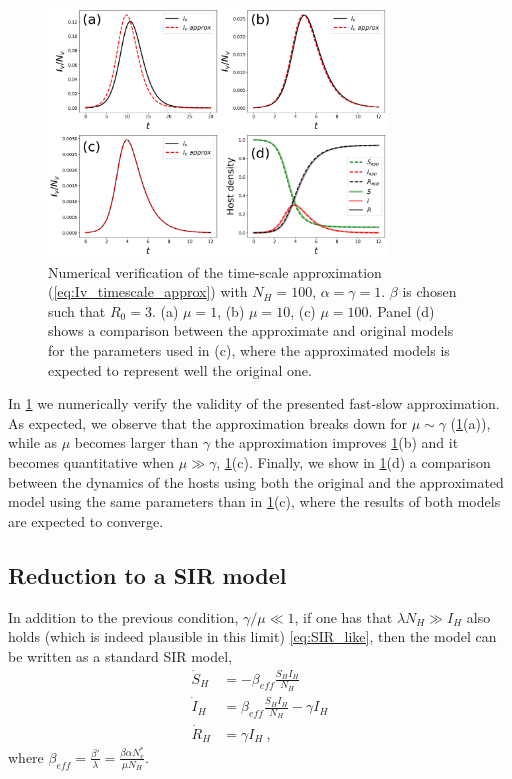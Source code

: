 \begin{figure}[H]
    \centering
    \includegraphics[width=0.8\textwidth]{Figures/Timescale_approx.pdf}
    \caption{Numerical verification of the time-scale approximation
        (\cref{eq:Iv_timescale_approx}) with $N_H=100$, $\alpha=\gamma=1$.
        $\beta$ is
        chosen such that $R_0=3$. (a) $\mu=1$, (b) $\mu=10$, (c) $\mu=100$.
        Panel (d)
        shows a comparison between the approximate and original models for the
        parameters used in (c), where the approximated models is expected to
        represent
        well the original one.}
    \label{fig:timescale_approx}
\end{figure}

In \cref{fig:timescale_approx} we numerically verify the validity of the
presented fast-slow approximation. As expected, we observe that the
approximation breaks down for $\mu\sim\gamma$ (\cref{fig:timescale_approx}(a)),
while as
$\mu$ becomes larger than $\gamma$ the approximation improves
\cref{fig:timescale_approx}(b) and it becomes quantitative when $\mu\gg\gamma$,
\cref{fig:timescale_approx}(c). Finally, we show in
\cref{fig:timescale_approx}(d) a comparison between the dynamics of the hosts
using both the original and the approximated model using the same parameters
than in \cref{fig:timescale_approx}(c), where the results of both models are
expected to converge.

\subsection{Reduction to a SIR model}

In addition to the previous condition, $\gamma/\mu\ll1$, if one has that
$\lambda N_H \gg I_H$ also holds (which is indeed plausible in this limit)
\cref{eq:SIR_like}, then the model can be written as a standard SIR model,
\begin{equation}\label{eq:SIR}
    \begin{aligned}
        \dot{S}_H & =-\beta_{eff}\frac{S_HI_H}{N_H}            \\
        \dot{I}_H & =\beta_{eff}\frac{S_HI_H}{N_H}- \gamma I_H \\
        \dot{R}_H & =\gamma I_H \ ,
    \end{aligned}
\end{equation}
where $\displaystyle\beta_{eff}=\frac{\beta'}{\lambda}=\frac{\beta\alpha
        N_v^*}{\mu N_H}$.

